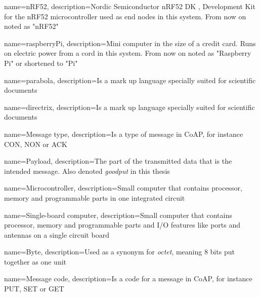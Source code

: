 \pagestyle{empty}



{
	name=nRF52,
    description={Nordic Semiconductor nRF52 DK , Development Kit for the nRF52 microcontroller used as end nodes in this system. From now on noted as "nRF52"}
}

{
	name=raspberryPi,
    description={Mini computer in the size of a credit card. Runs on electric power from a cord in this system. From now on noted as "Raspberry Pi" or shortened to "Pi"}
}


{
    name=parabola,
    description={Is a mark up language specially suited 
    for scientific documents}
}

{
    name=directrix,
    description={Is a mark up language specially suited 
    for scientific documents}
}

{
    name=Message type,
    description={Is a type of message in CoAP, for instance CON, NON or ACK}
}

{
    name=Payload,
    description={The part of the transmitted data that is the intended message. Also denoted \textit{goodput} in this thesis}
}

{
    name=Microcontroller,
    description={Small computer that contains processor, memory and programmable parts in one integrated circuit}
}

{
    name=Single-board computer,
    description={Small computer that contains processor, memory and programmable parts and I/O features like ports and antennas on a single circuit board}
}


{
    name=Byte,
    description={Used as a synonym for \textit{octet}, meaning 8 bits put together as one unit}
}

{
    name=Message code,
    description={Is a code for a message in CoAP, for instance PUT, SET or GET}
}




